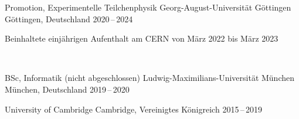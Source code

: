 \begin{cventries}
  \cventry%
    {Promotion, Experimentelle Teilchenphysik} %
    {Georg-August-Universit\"at G\"ottingen} %
    {G\"ottingen, Deutschland} %
    {2020\,--\,2024} %
    {%
      \begin{cvitems} %
        \item {%
            Beinhaltete einj\"ahrigen Aufenthalt am CERN von M\"arz 2022 bis M\"arz 2023
        }%
      \end{cvitems}%
      ~%
    }%

  \cventry%
    {BSc, Informatik (nicht abgeschlossen)} %
    {Ludwig-Maximilians-Universit\"at M\"unchen} %
    {M\"unchen, Deutschland} %
    {2019\,--\,2020} %
    {}%

    {University of Cambridge} %
    {Cambridge, Vereinigtes K\"onigreich} %
    {2015\,--\,2019} %
    {%
    }%
\end{cventries}
